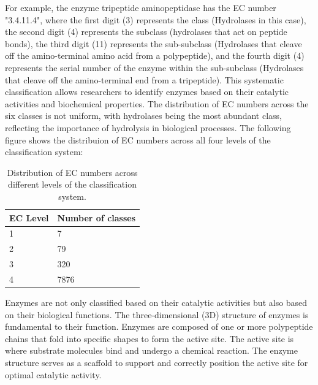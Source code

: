 For example, the enzyme tripeptide aminopeptidase has the EC number "3.4.11.4", where the first digit (3) represents the class (Hydrolases in this case), the second digit (4) represents the subclass (hydrolases that act on peptide bonds), the third digit (11) represents the sub-subclass (Hydrolases that cleave off the amino-terminal amino acid from a polypeptide), and the fourth digit (4) represents the serial number of the enzyme within the sub-subclass (Hydrolases that cleave off the amino-terminal end from a tripeptide). This systematic classification allows researchers to identify enzymes based on their catalytic activities and biochemical properties. \autocite{EnzymeNomenclatureRecommendations1994}
The distribution of EC numbers across the six classes is not uniform, with hydrolases being the most abundant class, reflecting the importance of hydrolysis in biological processes. The following figure shows the distribuion of EC numbers across all four levels of the classification system:

\begin{table}[hbt]
    \centering
    \begin{tabular}{@{}ll@{}}
    \toprule
    \textbf{EC Level} & \textbf{Number of classes} \\ \midrule
    1                 & 7                          \\
    2                 & 79                         \\
    3                 & 320                        \\
    4                 & 7876                       \\ \bottomrule
    \end{tabular}
    \caption{Distribution of EC numbers across different levels of the classification system.}
    \label{tab:ec-level-distribution}
\end{table}

Enzymes are not only classified based on their catalytic activities but also based on their biological functions. The three-dimensional (3D) structure of enzymes is fundamental to their function. Enzymes are composed of one or more polypeptide chains that fold into specific shapes to form the active site. The active site is where substrate molecules bind and undergo a chemical reaction. The enzyme structure serves as a scaffold to support and correctly position the active site for optimal catalytic activity. 

